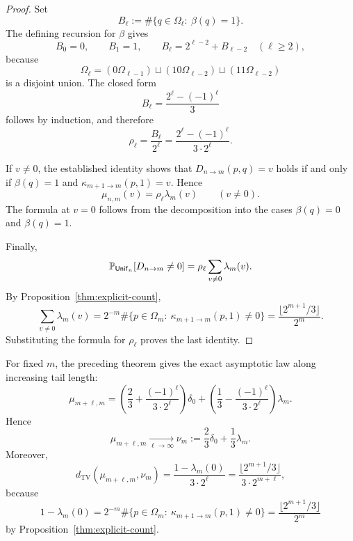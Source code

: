 \begin{proof}
Set
\[
B_\ell:=\#\{q\in\Omega_\ell:\ \beta(q)=1\}.
\]
The defining recursion for $\beta$ gives
\[
B_0=0,
\qquad
B_1=1,
\qquad
B_\ell=2^{\ell-2}+B_{\ell-2}\quad (\ell\ge 2),
\]
because
\[
\Omega_\ell=(0\Omega_{\ell-1})\sqcup(10\Omega_{\ell-2})\sqcup(11\Omega_{\ell-2})
\]
is a disjoint union.  The closed form
\[
B_\ell=\frac{2^\ell-(-1)^\ell}{3}
\]
follows by induction, and therefore
\[
\rho_\ell=\frac{B_\ell}{2^\ell}
=
\frac{2^\ell-(-1)^\ell}{3\cdot 2^\ell}.
\]

If $v\ne 0$, the established identity shows that
$D_{n\to m}(p,q)=v$ holds if and only if $\beta(q)=1$ and
$\kappa_{m+1\to m}(p,1)=v$.  Hence
\[
\mu_{n,m}(v)=\rho_\ell\lambda_m(v)
\qquad (v\ne 0).
\]
The formula at $v=0$ follows from the decomposition into the cases
$\beta(q)=0$ and $\beta(q)=1$.

Finally,
\[
\mathbb{P}_{\mathsf{Unif}_n}[D_{n\to m}\ne 0]
=
\rho_\ell\sum_{v\ne 0}\lambda_m(v).
\]
By Proposition~\ref{thm:explicit-count},
\[
\sum_{v\ne 0}\lambda_m(v)
=
2^{-m}\#\{p\in\Omega_m:\ \kappa_{m+1\to m}(p,1)\ne 0\}
=
\frac{\lfloor 2^{m+1}/3\rfloor}{2^m}.
\]
Substituting the formula for $\rho_\ell$ proves the last identity.
\end{proof}

\begin{remark}
\label{rem:limit-law}
For fixed $m$, the preceding theorem gives the exact asymptotic law along
increasing tail length:
\[
\mu_{m+\ell,m}
=
\left(\frac23+\frac{(-1)^\ell}{3\cdot 2^\ell}\right)\delta_0
+
\left(\frac13-\frac{(-1)^\ell}{3\cdot 2^\ell}\right)\lambda_m.
\]
Hence
\[
\mu_{m+\ell,m}\xrightarrow[\ell\to\infty]{}\nu_m
:=
\frac23\delta_0+\frac13\lambda_m.
\]
Moreover,
\[
d_{\mathrm{TV}}(\mu_{m+\ell,m},\nu_m)
=
\frac{1-\lambda_m(0)}{3\cdot 2^\ell}
=
\frac{\lfloor 2^{m+1}/3\rfloor}{3\cdot 2^{m+\ell}},
\]
because
\[
1-\lambda_m(0)
=
2^{-m}\#\{p\in\Omega_m:\ \kappa_{m+1\to m}(p,1)\ne 0\}
=
\frac{\lfloor 2^{m+1}/3\rfloor}{2^m}
\]
by Proposition~\ref{thm:explicit-count}.
\end{remark}


